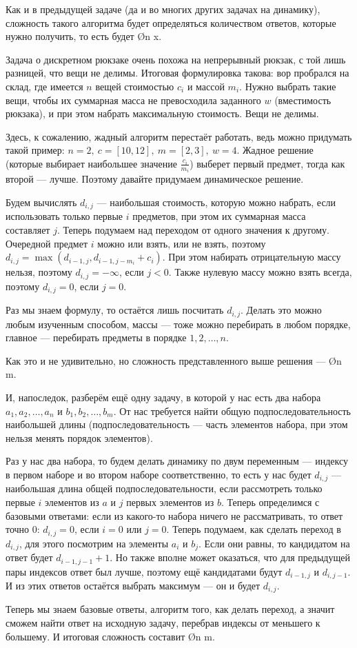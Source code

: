 Как и в предыдущей задаче (да и во многих других задачах на динамику), сложность такого алгоритма будет определяться количеством ответов, которые нужно получить, то есть будет \O{n \cdot x}.


Задача о дискретном рюкзаке очень похожа на непрерывный рюкзак, с той лишь разницей, что вещи не делимы. Итоговая формулировка такова: вор пробрался на склад, где имеется $n$ вещей стоимостью $c_i$ и массой $m_i$. Нужно выбрать такие вещи, чтобы их суммарная масса не превосходила заданного $w$ (вместимость рюкзака), и при этом набрать максимальную стоимость. Вещи не делимы.

Здесь, к сожалению, жадный алгоритм перестаёт работать, ведь можно придумать такой пример: $n = 2,\ c = [10, 12],\ m = [2, 3],\ w = 4$. Жадное решение (которые выбирает наибольшее значение $\frac{c_i}{m_i}$) выберет первый предмет, тогда как второй — лучше. Поэтому давайте придумаем динамическое решение.

Будем вычислять $d_{i, j}$ — наибольшая стоимость, которую можно набрать, если использовать только первые $i$ предметов, при этом их суммарная масса составляет $j$. Теперь подумаем над переходом от одного значения к другому. Очередной предмет $i$ можно или взять, или не взять, поэтому $d_{i, j} = \max( d_{i - 1, j}, d_{i - 1, j - m_i} + c_i)$. При этом набирать отрицательную массу нельзя, поэтому $d_{i, j} = -\infty$, если $j < 0$. Также нулевую массу можно взять всегда, поэтому $d_{i, j} = 0$, если $j = 0$.

Раз мы знаем формулу, то остаётся лишь посчитать $d_{i, j}$. Делать это можно любым изученным способом, массы — тоже можно перебирать в любом порядке, главное — перебирать предметы в порядке $1, 2, \ldots, n$.

Как это и не удивительно, но сложность представленного выше решения — \O{n \cdot m}.


И, напоследок, разберём ещё одну задачу, в которой у нас есть два набора $a_1, a_2, \ldots, a_n$ и $b_1, b_2, \ldots, b_m$. От нас требуется найти общую подпоследовательность наибольшей длины (подпоследовательность — часть элементов набора, при этом нельзя менять порядок элементов).

Раз у нас два набора, то будем делать динамику по двум переменным — индексу в первом наборе и во втором наборе соответственно, то есть у нас будет $d_{i, j}$ — наибольшая длина общей подпоследовательности, если рассмотреть только первые $i$ элементов из $a$ и $j$ первых элементов из $b$. Теперь определимся с базовыми ответами: если из какого-то набора ничего не рассматривать, то ответ точно 0: $d_{i, j} = 0$, если $i = 0$ или $j = 0$. Теперь подумаем, как сделать переход в $d_{i, j}$, для этого посмотрим на элементы $a_i$ и $b_j$. Если они равны, то кандидатом на ответ будет $d_{i - 1, j - 1} + 1$. Но также вполне может оказаться, что для предыдущей пары индексов ответ был лучше, поэтому ещё кандидатами будут $d_{i - 1, j}$ и $d_{i, j - 1}$. И из этих ответов остаётся выбрать максимум — он и будет $d_{i, j}$.

Теперь мы знаем базовые ответы, алгоритм того, как делать переход, а значит сможем найти ответ на исходную задачу, перебрав индексы от меньшего к большему. И итоговая сложность составит \O{n \cdot m}.
